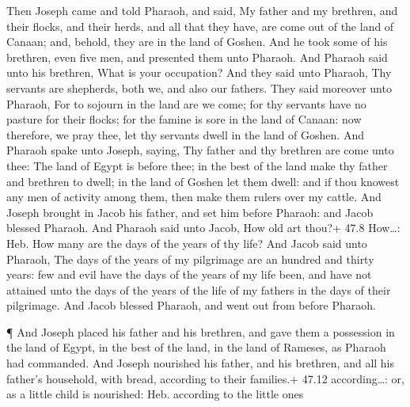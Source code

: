  Then Joseph came and told Pharaoh, and said, My father and
my brethren, and their flocks, and their herds, and all that they have,
are come out of the land of Canaan; and, behold, they are in the land of
Goshen.  And he took some of his brethren, even five men,
and presented them unto Pharaoh.  And Pharaoh said unto his
brethren, What is your occupation? And they said unto Pharaoh, Thy
servants are shepherds, both we, and also our fathers.  They
said moreover unto Pharaoh, For to sojourn in the land are we come; for
thy servants have no pasture for their flocks; for the famine is sore in
the land of Canaan: now therefore, we pray thee, let thy servants dwell
in the land of Goshen.  And Pharaoh spake unto Joseph,
saying, Thy father and thy brethren are come unto thee:  The
land of Egypt is before thee; in the best of the land make thy father
and brethren to dwell; in the land of Goshen let them dwell: and if thou
knowest any men of activity among them, then make them rulers over my
cattle.  And Joseph brought in Jacob his father, and set him
before Pharaoh: and Jacob blessed Pharaoh.  And Pharaoh said
unto Jacob, How old art thou?+ 47.8 How\ldots: Heb. How many are the
days of the years of thy life?  And Jacob said unto Pharaoh,
The days of the years of my pilgrimage are an hundred and thirty years:
few and evil have the days of the years of my life been, and have not
attained unto the days of the years of the life of my fathers in the
days of their pilgrimage.  And Jacob blessed Pharaoh, and
went out from before Pharaoh.

 ¶ And Joseph placed his father and his brethren, and gave
them a possession in the land of Egypt, in the best of the land, in the
land of Rameses, as Pharaoh had commanded.  And Joseph
nourished his father, and his brethren, and all his father's household,
with bread, according to their families.+ 47.12 according\ldots: or, as
a little child is nourished: Heb. according to the little ones

